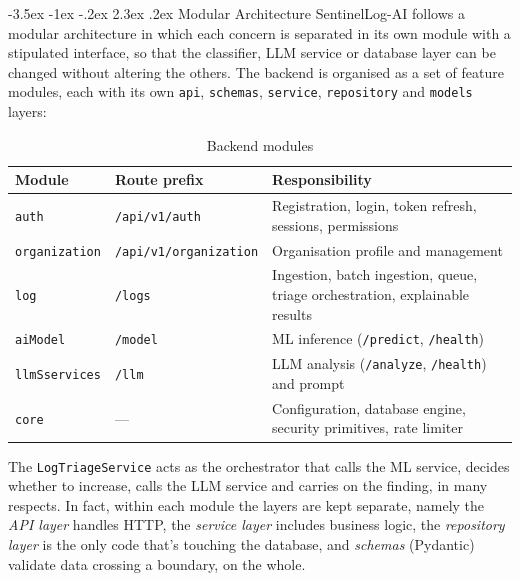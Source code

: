 \documentclass[12pt,a4paper]{report}
\makeatletter
\renewcommand{\arraystretch}{1.05}
\renewcommand\section{\@startsection {section}{1}{\z@}%
  {-3.5ex \@plus -1ex \@minus -.2ex}%
  {2.3ex \@plus .2ex}%
  {\normalfont\fontsize{17}{21}\selectfont\bfseries}}
\makeatother
\begin{document}
\section{Modular Architecture}
SentinelLog-AI follows a modular architecture in which each concern is separated in its own module with a stipulated interface, so that the classifier, LLM service or database layer can be changed without altering the others. The backend is organised as a set of feature modules, each with its own \texttt{api}, \texttt{schemas}, \texttt{service}, \texttt{repository} and \texttt{models} layers:

\begin{table}[htbp]
\centering
\caption{Backend modules}
\label{tab:modules}
\small
\renewcommand{\arraystretch}{1.2}
\begin{tabularx}{\textwidth}{>{\raggedright\arraybackslash}p{3.6cm} >{\raggedright\arraybackslash}p{3.2cm} >{\raggedright\arraybackslash}X}
\toprule
\textbf{Module} & \textbf{Route prefix} & \textbf{Responsibility}\\
\midrule
\texttt{auth} & \texttt{/api/v1/auth} & Registration, login, token refresh, sessions, permissions\\
\texttt{organization} & \texttt{/api/v1/organization} & Organisation profile and management\\
\texttt{log} & \texttt{/logs} & Ingestion, batch ingestion, queue, triage orchestration, explainable results\\
\texttt{aiModel} & \texttt{/model} & ML inference (\texttt{/predict}, \texttt{/health})\\
\texttt{llmSservices} & \texttt{/llm} & LLM analysis (\texttt{/analyze}, \texttt{/health}) and prompt\\
\texttt{core} & --- & Configuration, database engine, security primitives, rate limiter\\
\bottomrule
\end{tabularx}
\end{table}

The \texttt{LogTriageService} acts as the orchestrator that calls the ML service, decides whether to increase, calls the LLM service and carries on the finding, in many respects. In fact, within each module the layers are kept separate, namely the \emph{API layer} handles HTTP, the \emph{service layer} includes business logic, the \emph{repository layer} is the only code that's touching the database, and \emph{schemas} (Pydantic) validate data crossing a boundary, on the whole.
\end{document}
